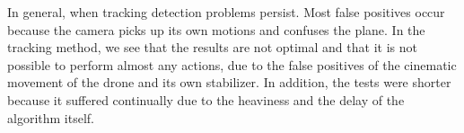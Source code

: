 In general, when tracking detection problems persist. Most false positives occur because the camera picks up its own motions and confuses the plane. In the tracking method, we see that the results are not optimal and that it is not possible to perform almost any actions, due to the false positives of the cinematic movement of the drone and its own stabilizer. In addition, the tests were shorter because it suffered continually due to the heaviness and the delay of the algorithm itself.

